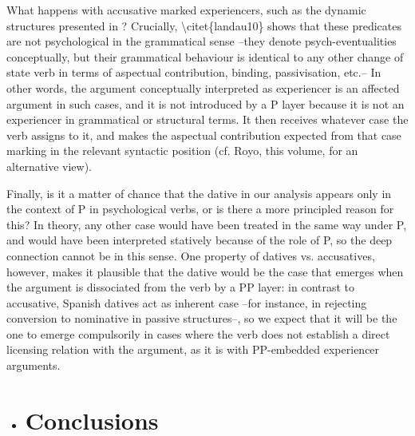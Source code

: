 \documentclass[output=paper,modfonts,nonflat]{langsci/langscibook}
\begin{document}
What happens with accusative marked experiencers, such as the dynamic structures presented in ? Crucially, {\textbackslash}citet\{landau10\} shows that these predicates are not psychological in the grammatical sense –they denote psych-eventualities conceptually, but their grammatical behaviour is identical to any other change of state verb in terms of aspectual contribution, binding, passivisation, etc.– In other words, the argument conceptually interpreted as experiencer is an affected argument in such cases, and it is not introduced by a P layer because it is not an experiencer in grammatical or structural terms. It then receives whatever case the verb assigns to it, and makes the aspectual contribution expected from that case marking in the relevant syntactic position (cf. Royo, this volume, for an alternative view).

Finally, is it a matter of chance that the dative in our analysis appears only in the context of P in psychological verbs, or is there a more principled reason for this? In theory, any other case would have been treated in the same way under P, and would have been interpreted statively because of the role of P, so the deep connection cannot be in this sense. One property of datives vs. accusatives, however, makes it plausible that the dative would be the case that emerges when the argument is dissociated from the verb by a PP layer: in contrast to accusative, Spanish datives act as inherent case –for instance, in rejecting conversion to nominative in passive structures–, so we expect that it will be the one to emerge compulsorily in cases where the verb does not establish a direct licensing relation with the argument, as it is with PP-embedded experiencer arguments.

\begin{itemize}
\item \section{Conclusions}
\end{itemize}
\end{document}
